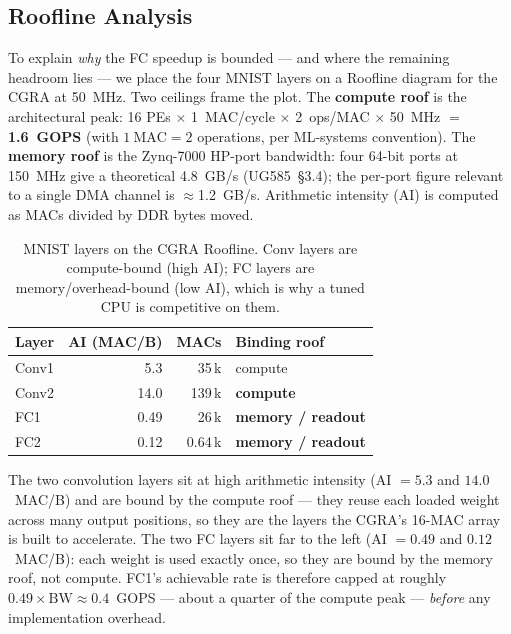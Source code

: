 \subsection{Roofline Analysis}
\label{ssec:roofline}

To explain \emph{why} the FC speedup is bounded --- and where the
remaining headroom lies --- we place the four MNIST layers on a
Roofline diagram for the CGRA at 50~MHz. Two ceilings frame the plot.
The \textbf{compute roof} is the architectural peak: 16 PEs
$\times$ 1~MAC/cycle $\times$ 2~ops/MAC $\times$ 50~MHz $=$
\textbf{1.6~GOPS} (with $1~\text{MAC}=2$ operations, per ML-systems
convention). The \textbf{memory roof} is the Zynq-7000 HP-port
bandwidth: four 64-bit ports at 150~MHz give a theoretical
4.8~GB/s (UG585~\S3.4); the per-port figure relevant to a single
DMA channel is $\approx$1.2~GB/s. Arithmetic intensity (AI) is
computed as MACs divided by DDR bytes moved.

\begin{table}[h]
\centering
\caption{MNIST layers on the CGRA Roofline. Conv layers are
compute-bound (high AI); FC layers are memory/overhead-bound (low AI),
which is why a tuned CPU is competitive on them.}
\label{tab:roofline}
\begin{tabular}{lrrl}
\hline
\textbf{Layer} & \textbf{AI (MAC/B)} & \textbf{MACs} & \textbf{Binding roof} \\
\hline
Conv1 & 5.3  & 35\,k  & compute \\
Conv2 & 14.0 & 139\,k & \textbf{compute} \\
FC1   & 0.49 & 26\,k  & \textbf{memory / readout} \\
FC2   & 0.12 & 0.64\,k& \textbf{memory / readout} \\
\hline
\end{tabular}
\end{table}

\noindent The two convolution layers sit at high arithmetic intensity
(AI $=5.3$ and $14.0$~MAC/B) and are bound by the compute roof --- they
reuse each loaded weight across many output positions, so they are the
layers the CGRA's 16-MAC array is built to accelerate. The two FC
layers sit far to the left (AI $=0.49$ and $0.12$~MAC/B): each weight is
used exactly once, so they are bound by the memory roof, not compute.
FC1's achievable rate is therefore capped at roughly
$0.49 \times \text{BW} \approx 0.4$~GOPS --- about a quarter of the
compute peak --- \emph{before} any implementation overhead.

